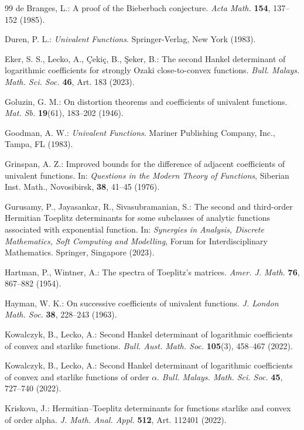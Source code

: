 \documentclass[11pt,reqno]{amsart}
\numberwithin{equation}{section}
\begin{document}
\begin{thebibliography}{99}
de Branges, L.:
A proof of the Bieberbach conjecture.
\textit{Acta Math.} \textbf{154}, 137--152 (1985).

Duren, P. L.:
\textit{Univalent Functions}.
Springer-Verlag, New York (1983).

Eker, S. S., Lecko, A., \c{C}eki\c{c}, B., \c{S}eker, B.:
The second Hankel determinant of logarithmic coefficients for strongly Ozaki close-to-convex functions.
\textit{Bull. Malays. Math. Sci. Soc.} \textbf{46}, Art. 183 (2023).

Goluzin, G. M.:
On distortion theorems and coefficients of univalent functions.
\textit{Mat. Sb.} \textbf{19}(61), 183--202 (1946).

Goodman, A. W.:
\textit{Univalent Functions}.
Mariner Publishing Company, Inc., Tampa, FL (1983).

Grinspan, A. Z.:
Improved bounds for the difference of adjacent coefficients of univalent functions.
In: \textit{Questions in the Modern Theory of Functions}, Siberian Inst. Math., Novosibirsk, \textbf{38}, 41--45 (1976).

Gurusamy, P., Jayasankar, R., Sivasubramanian, S.: 
The second and third-order Hermitian Toeplitz determinants for some subclasses of analytic functions associated with exponential function. 
In: \textit{Synergies in Analysis, Discrete Mathematics, Soft Computing and Modelling}, Forum for Interdisciplinary Mathematics. Springer, Singapore (2023).

Hartman, P., Wintner, A.: 
The spectra of Toeplitz's matrices. 
\textit{Amer. J. Math.} \textbf{76}, 867--882 (1954).

Hayman, W. K.:
On successive coefficients of univalent functions.
\textit{J. London Math. Soc.} \textbf{38}, 228--243 (1963).

Kowalczyk, B., Lecko, A.:
Second Hankel determinant of logarithmic coefficients of convex and starlike functions.
\textit{Bull. Aust. Math. Soc.} \textbf{105}(3), 458--467 (2022).

Kowalczyk, B., Lecko, A.:
Second Hankel determinant of logarithmic coefficients of convex and starlike functions of order $\alpha$.
\textit{Bull. Malays. Math. Sci. Soc.} \textbf{45}, 727--740 (2022).

Kriskova, J.:
Hermitian--Toeplitz determinants for functions starlike and convex of order alpha.
\textit{J. Math. Anal. Appl.} \textbf{512}, Art. 112401 (2022).


\end{thebibliography}
\end{document}
